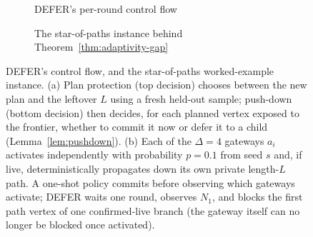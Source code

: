 \documentclass[preprint,11pt]{elsarticle}
\theoremstyle{definition}
\theoremstyle{remark}
\begin{document}
\begin{figure}[h]
\begin{subfigure}[t]{0.32\textwidth}
{\begin{tikzpicture}
\end{tikzpicture}}
\caption{DEFER's per-round control flow}
\label{fig:defer-flow}
\end{subfigure}%
\hfill
\begin{subfigure}[t]{0.64\textwidth}
\centering
{}
\caption{The star-of-paths instance behind Theorem~\ref{thm:adaptivity-gap}}
\label{fig:star-of-paths}
\end{subfigure}

\caption{DEFER's control flow, and the star-of-paths worked-example instance. (a) Plan protection (top decision) chooses between the new plan and the
leftover $L$ using a fresh held-out sample; push-down (bottom decision)
then decides, for each planned vertex exposed to the frontier, whether to
commit it now or defer it to a child (Lemma~\ref{lem:pushdown}). (b) Each
of the $\Delta=4$ gateways $a_i$ activates independently with probability
$p=0.1$ from seed $s$ and, if live, deterministically propagates down its
own private length-$L$ path. A one-shot policy commits before observing
which gateways activate; DEFER waits one round, observes $N_1$, and
blocks the first path vertex of one confirmed-live branch (the gateway
itself can no longer be blocked once activated).}
\end{figure}
\end{document}

